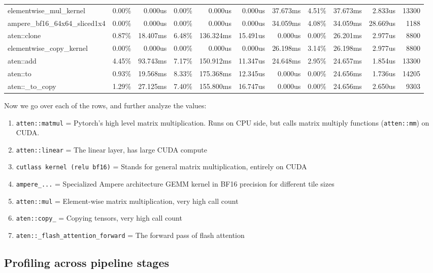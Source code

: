 \begin{table}[htbp]
{\begin{tabular}{lrrrrrrrrrr}
elementwise\_mul\_kernel & 0.00\% & 0.000us & 0.00\% & 0.000us & 0.000us & 37.673ms & 4.51\% & 37.673ms & 2.833us & 13300 \\
ampere\_bf16\_64x64\_sliced1x4 & 0.00\% & 0.000us & 0.00\% & 0.000us & 0.000us & 34.059ms & 4.08\% & 34.059ms & 28.669us & 1188 \\
aten::clone & 0.87\% & 18.407ms & 6.48\% & 136.324ms & 15.491us & 0.000us & 0.00\% & 26.201ms & 2.977us & 8800 \\
elementwise\_copy\_kernel & 0.00\% & 0.000us & 0.00\% & 0.000us & 0.000us & 26.198ms & 3.14\% & 26.198ms & 2.977us & 8800 \\
aten::add & 4.45\% & 93.743ms & 7.17\% & 150.912ms & 11.347us & 24.648ms & 2.95\% & 24.657ms & 1.854us & 13300 \\
aten::to & 0.93\% & 19.568ms & 8.33\% & 175.368ms & 12.345us & 0.000us & 0.00\% & 24.656ms & 1.736us & 14205 \\
aten::\_to\_copy & 1.29\% & 27.125ms & 7.40\% & 155.800ms & 16.747us & 0.000us & 0.00\% & 24.656ms & 2.650us & 9303 \\
\bottomrule
\end{tabular}%
}
\end{table}


Now we go over each of the rows, and further analyze the values:
\begin{enumerate}
    \item \texttt{atten::matmul} = Pytorch's high level matrix multiplication. Runs on CPU side, but calls matrix multiply functions (\texttt{atten::mm}) on CUDA.
    \item \texttt{atten::linear} = The linear layer, has large CUDA compute
    \item \texttt{cutlass kernel (relu bf16)} = Stands for general matrix multiplication, entirely on CUDA
    \item \texttt{ampere\_...} = Specialized Ampere architecture GEMM kernel in BF16 precision for different tile sizes
    \item \texttt{atten::mul} = Element-wise matrix multiplication, very high call count
    \item \texttt{aten::copy\_} = Copying tensors, very high call count
    \item \texttt{aten::\_flash\_attention\_forward} = The forward pass of flash attention 
\end{enumerate}


\subsection{Profiling across pipeline stages}

